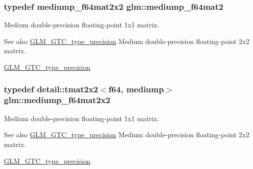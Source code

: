\subsubsection[{\texorpdfstring{mediump\+\_\+f64mat2}{mediump_f64mat2}}]{\setlength{\rightskip}{0pt plus 5cm}typedef mediump\+\_\+f64mat2x2 {\bf glm\+::mediump\+\_\+f64mat2}}\hypertarget{group__gtc__type__precision_gaa7eac0340d2aaf670ec4dfbd1826fd35}{}\label{group__gtc__type__precision_gaa7eac0340d2aaf670ec4dfbd1826fd35}
Medium double-\/precision floating-\/point 1x1 matrix. \begin{DoxySeeAlso}{See also}
\hyperlink{group__gtc__type__precision}{G\+L\+M\+\_\+\+G\+T\+C\+\_\+type\+\_\+precision} Medium double-\/precision floating-\/point 2x2 matrix. 

\hyperlink{group__gtc__type__precision}{G\+L\+M\+\_\+\+G\+T\+C\+\_\+type\+\_\+precision} 
\end{DoxySeeAlso}
\subsubsection[{\texorpdfstring{mediump\+\_\+f64mat2x2}{mediump_f64mat2x2}}]{\setlength{\rightskip}{0pt plus 5cm}typedef detail\+::tmat2x2$<$f64, mediump$>$ {\bf glm\+::mediump\+\_\+f64mat2x2}}\hypertarget{group__gtc__type__precision_gacfa9f872c78d9e8b8e6c5dd0088db8fc}{}\label{group__gtc__type__precision_gacfa9f872c78d9e8b8e6c5dd0088db8fc}
Medium double-\/precision floating-\/point 1x1 matrix. \begin{DoxySeeAlso}{See also}
\hyperlink{group__gtc__type__precision}{G\+L\+M\+\_\+\+G\+T\+C\+\_\+type\+\_\+precision} Medium double-\/precision floating-\/point 2x2 matrix. 

\hyperlink{group__gtc__type__precision}{G\+L\+M\+\_\+\+G\+T\+C\+\_\+type\+\_\+precision} 
\end{DoxySeeAlso}
